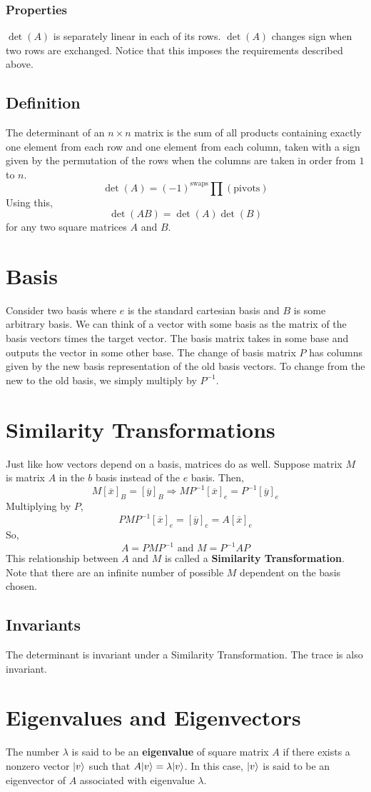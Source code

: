 \documentclass[../main.tex]{subfiles}
\DeclarePairedDelimiter\ket{\lvert}{\rangle}
\begin{document}
\subsubsection{Properties}
$\det(A)$ is separately linear in each of its rows. $\det(A)$ changes sign when two rows
are exchanged. Notice that this imposes the requirements described above.
\subsection{Definition}
The determinant of an $n\times n$ matrix is the sum of all products containing exactly one
element from each row and one element from each column, taken with a sign given by the permutation of the 
rows when the columns are taken in order from $1$ to $n$.
$$\det(A)=(-1)^{\text{swaps}}\prod (\text{pivots})$$
Using this,
$$\det(AB)=\det(A)\det(B)$$
for any two square matrices $A$ and $B$.

\section{Basis}
Consider two basis where $e$ is the standard cartesian basis and $B$ is some arbitrary basis.
We can think of a vector with some basis as the matrix of the basis vectors times the target vector.
The basis matrix takes in some base and outputs the vector in some other base. The change of 
basis matrix $P$ has columns given by the new basis representation of the old basis vectors.
To change from the new to the old basis, we simply multiply by $P^{-1}$.

\section{Similarity Transformations}
Just like how vectors depend on a basis, matrices do as well. Suppose
matrix $M$ is matrix $A$ in the $b$ basis instead of the $e$ basis. Then,
$$M[\overline{x}]_{B}=[\overline{y}]_{B}\Rightarrow MP^{-1}[\overline{x}]_{e}=P^{-1}[\overline{y}]_{e}$$
Multiplying by $P$,
$$PMP^{-1}[\overline{x}]_{e}=[\overline{y}]_{e}=A[\overline{x}]_{e}$$
So,
$$A=PMP^{-1} \text{ and } M=P^{-1}AP$$
This relationship between $A$ and $M$ is called a \textbf{Similarity Transformation}.
Note that there are an infinite number of possible $M$ dependent on the basis chosen.
\subsection{Invariants}
The determinant is invariant under a Similarity Transformation. The trace is also invariant.

\section{Eigenvalues and Eigenvectors}
The number $\lambda$ is said to be an \textbf{eigenvalue} of square matrix $A$ if 
there exists a nonzero vector $\ket{v}$ such that $A\ket{v}=\lambda\ket{v}$. 
In this case, $\ket{v}$ is said to be an eigenvector of $A$ associated with eigenvalue
$\lambda$.
\end{document}
